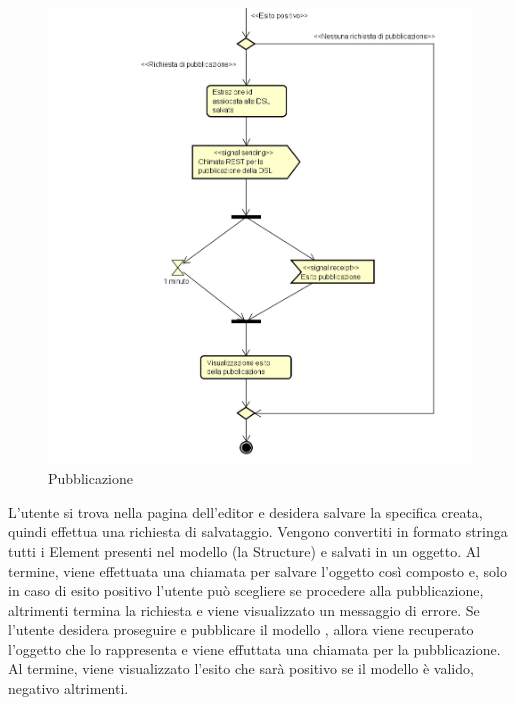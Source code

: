     \begin{figure}[H]
      \centering
      \includegraphics[width=.9\textwidth]{res/img/pubblicazione.png}
      \caption{Pubblicazione}
      \label{fig:pubblicazione}
    \end{figure}
    L'utente si trova nella pagina dell'editor e desidera salvare la specifica  creata, quindi effettua una richiesta di salvataggio. Vengono convertiti in formato stringa tutti i  Element presenti nel modello (la  Structure) e salvati in un oggetto. Al termine, viene effettuata una chiamata  per salvare l'oggetto così composto e, solo in caso di esito positivo l'utente può scegliere se procedere alla pubblicazione, altrimenti termina la richiesta e viene visualizzato un messaggio di errore.
    Se l'utente desidera proseguire e pubblicare il modello , allora viene recuperato l'oggetto che lo rappresenta e viene effuttata una chiamata  per la pubblicazione. Al termine, viene visualizzato l'esito che sarà positivo se il modello è valido, negativo altrimenti.
